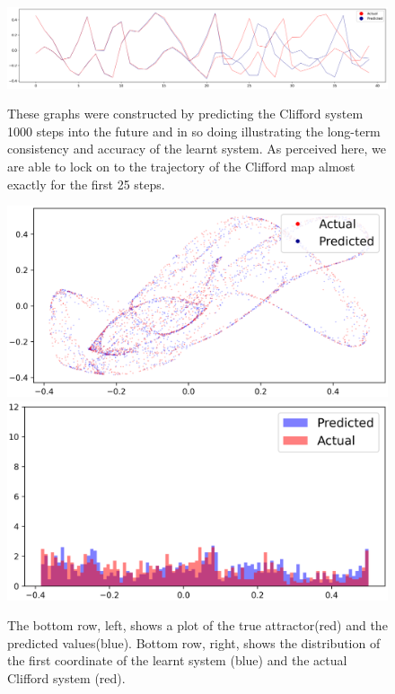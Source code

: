 \documentclass[a4paper,12pt,twoside]{report}
\begin{document}
\begin{figure}[ht]
  \centering
  \includegraphics[width=1.0\textwidth,left]{_Clifford_1_nonoise.eps}
  \caption*{These graphs were constructed by predicting the Clifford system 1000 steps into the future and in so doing illustrating the long-term consistency and accuracy of the learnt system. As perceived here, we are able to lock on to the trajectory of the Clifford map almost exactly for the first 25 steps.}
      \centering
      \includegraphics[width=\linewidth]{_Clifford_2_nonoise.eps}
  \endminipage\hfill
    \centering
    \includegraphics[width=\linewidth]{_Clifford_3_nonoise.eps}
  \endminipage
  \caption{The bottom row, left, shows a plot of the true attractor(red) and the predicted values(blue). Bottom row, right, shows the distribution of the first coordinate of the learnt system (blue) and the actual Clifford system (red). }
  \label{fig:Clifford}
\end{figure}
\end{document}
